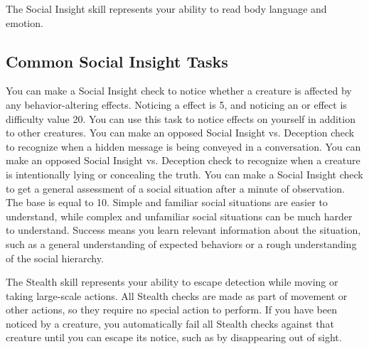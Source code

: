 \newpage
{}
        The Social Insight skill represents your ability to read body language and emotion.

    \subsection{Common Social Insight Tasks}
         You can make a Social Insight check to notice whether a creature is affected by any behavior-altering effects.
        Noticing a  effect is  5, and noticing an  or  effect is difficulty value 20.
        You can use this task to notice effects on yourself in addition to other creatures.
         You can make an opposed Social Insight vs. Deception check to recognize when a hidden message is being conveyed in a conversation.
         You can make an opposed Social Insight vs. Deception check to recognize when a creature is intentionally lying or concealing the truth.
        \label{Social Assessment}
        You can make a Social Insight check to get a general assessment of a social situation after a minute of observation.
        The base  is equal to 10.
        Simple and familiar social situations are easier to understand, while complex and unfamiliar social situations can be much harder to understand.
        Success means you learn relevant information about the situation, such as a general understanding of expected behaviors or a rough understanding of the social hierarchy.

\newpage
{}
        The Stealth skill represents your ability to escape detection while moving or taking large-scale actions.
        All Stealth checks are made as part of movement or other actions, so they require no special action to perform.
        If you have been noticed by a creature, you automatically fail all Stealth checks against that creature until you can escape its notice, such as by disappearing out of sight.

